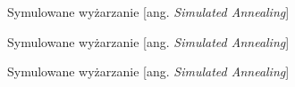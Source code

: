 \begin{frame}{Symulowane wyżarzanie [ang. \textit{Simulated Annealing}]}


\end{frame}

\begin{frame}{Symulowane wyżarzanie [ang. \textit{Simulated Annealing}]}
	

\end{frame}

\begin{frame}{Symulowane wyżarzanie [ang. \textit{Simulated Annealing}]}


\end{frame}